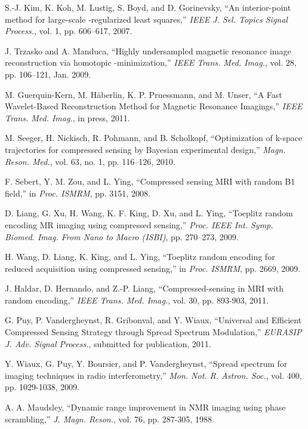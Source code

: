 \documentclass[10pt,draftcls, onecolumn]{IEEEtran}
\begin{document}
\begin{thebibliography}{}
S.-J. Kim, K. Koh, M. Lustig, S. Boyd, and D. Gorinevsky, ``An interior-point method for large-scale -regularized least squares,'' \emph{IEEE J. Sel. Topics Signal Process.}, vol. 1, pp. 606–617, 2007.

J. Trzasko and A. Manduca, ``Highly undersampled magnetic resonance image reconstruction via homotopic -minimization,'' \emph{IEEE Trans. Med. Imag.}, vol. 28, pp. 106–121, Jan. 2009.

M. Guerquin-Kern, M. H\"aberlin, K. P. Pruessmann, and M. Unser, ``A Fast Wavelet-Based Reconstruction Method for Magnetic Resonance Imagings,'' \emph{IEEE Trans. Med. Imag.}, in press, 2011.

M. Seeger, H. Nickisch, R. Pohmann, and B. Scholkopf, ``Optimization of k-space trajectories for compressed sensing by Bayesian experimental design,'' \emph{Magn. Reson. Med.}, vol. 63, no. 1, pp. 116–126, 2010.

F. Sebert, Y. M. Zou, and L. Ying, ``Compressed sensing MRI with random B1 field,'' in \emph{Proc. ISMRM}, pp. 3151, 2008.

D. Liang, G. Xu, H. Wang, K. F. King, D. Xu, and L. Ying, ``Toeplitz random encoding MR imaging using compressed sensing,'' \emph{Proc. IEEE Int. Symp. Biomed. Imag. From Nano to Macro (ISBI)}, pp. 270–273, 2009.

H. Wang, D. Liang, K. King, and L. Ying, ``Toeplitz random encoding for reduced acquisition using compressed sensing,'' in \emph{Proc. ISMRM}, pp. 2669, 2009.

J. Haldar, D. Hernando, and Z.-P. Liang, ``Compressed-sensing in MRI with random encoding,'' \emph{IEEE Trans. Med. Imag.}, vol. 30, pp. 893-903, 2011.

G. Puy, P. Vandergheynst, R. Gribonval, and Y. Wiaux, ``Universal and Efficient Compressed Sensing Strategy through Spread Spectrum Modulation,'' \emph{EURASIP J. Adv. Signal Process.}, submitted for publication, 2011.

Y. Wiaux, G. Puy, Y. Boursier, and P. Vandergheynst, ``Spread spectrum for imaging techniques in radio interferometry,'' \emph{Mon. Not. R. Astron. Soc.}, vol. 400, pp. 1029-1038, 2009.

A. A. Maudsley, ``Dynamic range improvement in NMR imaging using phase scrambling,'' \emph{J. Magn. Reson.}, vol. 76, pp. 287-305, 1988.


\end{thebibliography}
\end{document}
